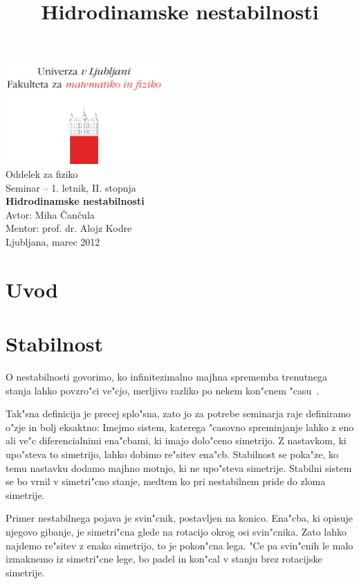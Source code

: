 \documentclass[a4paper,10pt]{article}
\title{Hidrodinamske nestabilnosti}
\begin{document}
\begin{center}
\includegraphics[width=6cm]{../logo_fmf_uni-lj_sl}\\[0.5cm]
Oddelek za fiziko \\[2cm]
{ \large Seminar -- 1. letnik, II. stopnja } \\[1cm]
{ \huge \bf Hidrodinamske nestabilnosti}\\[2cm]
{\large Avtor: Miha \v Can\v cula}\\[0.6cm]
{\large Mentor: prof. dr. Alojz Kodre} \\[0.6cm]
{\large Ljubljana, marec 2012}
\end{center}
\vfill

\begin{abstract}

\end{abstract}

\newpage

\tableofcontents

\section{Uvod}

\section{Stabilnost}

O nestabilnosti govorimo, ko infinitezimalno majhna sprememba trenutnega stanja lahko povzro"ci ve"cjo, merljivo razliko po nekem kon"cnem "casu~\cite{drazin}. 

Tak"sna definicija je precej splo"sna, zato jo za potrebe seminarja raje definiramo o"zje in bolj eksaktno: Imejmo sistem, katerega "casovno spreminjanje lahko z eno ali ve"c diferencialnimi ena"cbami, ki imajo dolo"ceno simetrijo. Z nastavkom, ki upo"steva to simetrijo, lahko dobimo re"sitev ena"cb. Stabilnost se poka"ze, ko temu nastavku dodamo majhno motnjo, ki ne upo"steva simetrije. Stabilni sistem se bo vrnil v simetri"cno stanje, medtem ko pri nestabilnem pride do zloma simetrije. 

Primer nestabilnega pojava je svin"cnik, postavljen na konico. Ena"cba, ki opisuje njegovo gibanje, je simetri"cna glede na rotacijo okrog osi svin"cnika. Zato lahko najdemo re"sitev z enako simetrijo, to je pokon"cna lega. "Ce pa svin"cnih le malo izmaknemo iz simetri"cne lege, bo padel in kon"cal v stanju brez rotacijske simetrije. 
\end{document}
